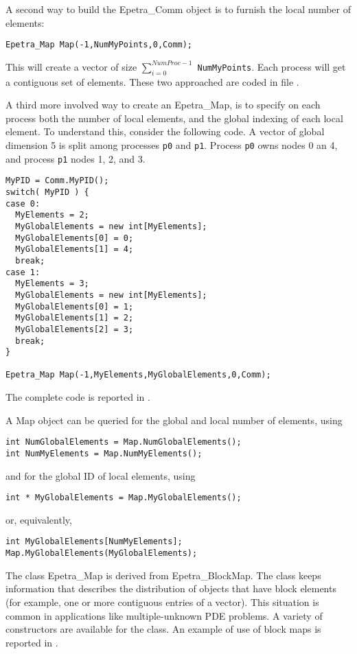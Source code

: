 A second way to build the Epetra\_Comm object is to furnish the local
number of elements:
\begin{verbatim}
Epetra_Map Map(-1,NumMyPoints,0,Comm);
\end{verbatim}
This will create a vector of size $\sum_{i=0}^{NumProc-1}$
\verb!NumMyPoints!. Each process will get a contiguous set of elements.
These two approached are coded in file \newline {}.

A third more involved way to create an Epetra\_Map, is to specify on
each process both the number of local elements, and the global indexing
of each local element. To understand this, consider the following code.
A vector of global dimension 5 is split among processes \verb!p0! and
\verb!p1!. Process \verb!p0! owns nodes 0 an 4, and process \verb!p1!
nodes 1, 2, and 3.
\begin{verbatim}
MyPID = Comm.MyPID();
switch( MyPID ) {
case 0:
  MyElements = 2;
  MyGlobalElements = new int[MyElements];
  MyGlobalElements[0] = 0;
  MyGlobalElements[1] = 4;
  break;
case 1:
  MyElements = 3;
  MyGlobalElements = new int[MyElements];
  MyGlobalElements[0] = 1;
  MyGlobalElements[1] = 2;
  MyGlobalElements[2] = 3;
  break;
}

Epetra_Map Map(-1,MyElements,MyGlobalElements,0,Comm);
\end{verbatim}
The complete code is reported in .

A Map object can be queried for the global and local number of elements,
using
\begin{verbatim}
int NumGlobalElements = Map.NumGlobalElements();
int NumMyElements = Map.NumMyElements();
\end{verbatim}
and for the global ID of local elements, using
\begin{verbatim}
int * MyGlobalElements = Map.MyGlobalElements();
\end{verbatim}
or, equivalently,
\begin{verbatim}
int MyGlobalElements[NumMyElements];
Map.MyGlobalElements(MyGlobalElements);
\end{verbatim}

\bigskip

The class Epetra\_Map is derived from Epetra\_BlockMap. The class keeps
information that describes the distribution of objects that have block
elements (for example, one or more contiguous entries of a vector). This
situation is common in applications like multiple-unknown PDE problems.
A variety of constructors are available for the class. An example of
use of block maps is reported in .

